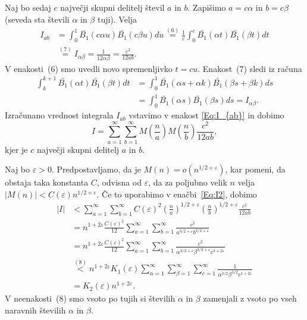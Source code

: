 \documentclass[mat1]{fmfdelo}
\begin{document}
Naj bo sedaj $c$ največji skupni delitelj števil $a$ in $b$. Zapišimo $a = c \alpha$ in $b = c \beta$ (seveda sta števili $\alpha$ in $\beta$ tuji). Velja
\begin{align}
I_{ab} &= \int_{0}^1 \bar{B_{1}}(c \alpha u) \bar{B_{1}}(c \beta u) du
	\stackrel{(6)}{=} \frac{1}{c} \int_{0}^c \bar{B_{1}}(\alpha t) \bar{B_{1}}(\beta t) dt \nonumber \\
	&\stackrel{(7)}{=} I_{\alpha \beta}
	= \frac{1}{12 \alpha \beta}
	= \frac{c^2}{12ab}.
\end{align}
V enakosti~(6) smo uvedli novo spremenljivko $t=cu$.
Enakost~(7) sledi iz računa
\begin{align*}
\int_{k}^{k+1} \bar{B_{1}}(\alpha t) \bar{B_{1}}(\beta t) dt &= \int_{0}^{1} \bar{B_{1}}(\alpha s + \alpha k) \bar{B_{1}}(\beta s + \beta k) ds \\
 	&= \int_{0}^{1} \bar{B_{1}}(\alpha s) \bar{B_{1}}(\beta s) ds = I_{\alpha \beta}.
\end{align*}
%
Izračunano vrednost integrala $I_{ab}$ vstavimo v enakost \eqref{Eq:I_{ab}} in dobimo
\begin{equation}
\label{Eq:I2}
I = \sum_{a=1}^{\infty} \sum_{b=1}^{\infty} M \left(\frac{n}{a} \right) M \left(\frac{n}{b} \right) \frac{c^2}{12ab},
\end{equation}
kjer je $c$ največji skupni delitelj $a$ in $b$.

Naj bo $\varepsilon>0$. Predpostavljamo, da je $M(n) = o(n^{1/2+\varepsilon})$, kar pomeni, da obstaja taka konstanta $C$, odvisna od $\varepsilon$, da za poljubno velik $n$ velja $ |M(n)| < C(\varepsilon) n^{1/2+\varepsilon}$. Če to uporabimo v enačbi~\eqref{Eq:I2}, dobimo
\begin{align}
|I| &< \sum_{a=1}^{\infty} \sum_{b=1}^{\infty} C(\varepsilon)^2 \left( \frac{n}{a} \right)^{1/2+\varepsilon} \left( \frac{n}{b} \right)^{1/2+\varepsilon} \frac{c^2}{12ab} \nonumber \\
  &= n^{1+2\varepsilon} \frac{C(\varepsilon)^2}{12} \sum_{a=1}^{\infty} \sum_{b=1}^{\infty} \frac{c^2}{a^{3/2+\varepsilon} b^{3/2+\varepsilon}} \nonumber \\
  &= n^{1+2\varepsilon} \frac{C(\varepsilon)^2}{12} \sum_{a=1}^{\infty} \sum_{b=1}^{\infty} \frac{c^2}{\alpha^{3/2+\varepsilon} \beta^{3/2+\varepsilon} c^{3+2\varepsilon}} \nonumber \\
  &\stackrel{(8)}{<} n^{1+2\varepsilon} K_{1}(\varepsilon) \sum_{\alpha=1}^{\infty} \sum_{\beta=1}^{\infty} \sum_{c=1}^{\infty} \frac{1}{\alpha^{3/2} \beta^{3/2} c^{1+2\varepsilon}} \nonumber \\
  &= K_{2}(\varepsilon) n^{1+2\varepsilon}.
\end{align}
V neenakosti~(8) smo vsoto po tujih si številih $\alpha$ in $\beta$ zamenjali z vsoto po vseh naravnih številih $\alpha$ in $\beta$.
\end{document}
